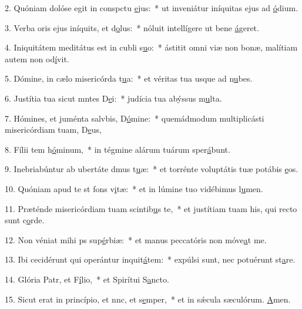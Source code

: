 2. Quóniam dolóse egit in conspctu \uline{e}jus:~* ut inveniátur iníquitas ejus ad \uline{ó}dium.\par 
3. Verba oris ejus iníquits, et d\uline{o}lus:~* nóluit intellígere ut bene \uline{á}geret.\par 
4. Iniquitátem meditátus est in cubli s\uline{u}o:~* ástitit omni viæ non bonæ, malítiam autem non od\uline{í}vit.\par 
5. Dómine, in cælo misericórda t\uline{u}a:~* et véritas tua usque ad n\uline{u}bes.\par 
6. Justítia tua sicut mntes D\uline{e}i:~* judícia tua abýssus m\uline{u}lta.\par 
7. Hómines, et juménta salvbis, D\uline{ó}mine:~* quemádmodum multiplicásti misericórdiam tuam, D\uline{e}us,\par 
8. Fílii tem h\uline{ó}minum,~* in tégmine alárum tuárum sper\uline{á}bunt.\par 
9. Inebriabúntur ab ubertáte dmus t\uline{u}æ:~* et torrénte voluptátis tuæ potábis \uline{e}os.\par 
10. Quóniam apud te st fons v\uline{i}tæ:~* et in lúmine tuo vidébimus l\uline{u}men.\par 
11. Præténde misericórdiam tuam scintib\uline{u}s te,~* et justítiam tuam his, qui recto sunt c\uline{o}rde.\par 
12. Non véniat mihi ps sup\uline{é}rbiæ:~* et manus peccatóris non móve\uline{a}t me.\par 
13. Ibi cecidérunt qui operántur inquit\uline{á}tem:~* expúlsi sunt, nec potuérunt st\uline{a}re.\par 
14. Glória Patr, et F\uline{í}lio,~* et Spirítui S\uline{a}ncto.\par 
15. Sicut erat in princípio, et nnc, et s\uline{e}mper,~* et in sǽcula sæculórum. \uline{A}men.\par 
